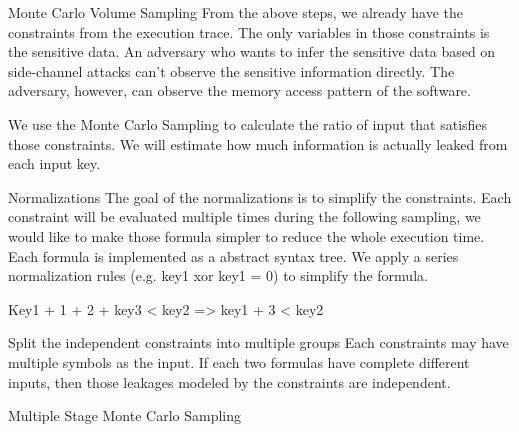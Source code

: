 Monte Carlo Volume Sampling
From the above steps, we already have the constraints from the execution trace. The only variables in those constraints is the sensitive data. An adversary who wants to infer the sensitive data based on side-channel attacks can’t observe the sensitive information directly. The adversary, however, can observe the memory access pattern of the software.  

We use the Monte Carlo Sampling to calculate the ratio of input that satisfies those constraints.
We will estimate how much information is actually leaked from each input key.

Normalizations
The goal of the normalizations is to simplify the constraints. Each constraint will be evaluated multiple times during the following sampling, we would like to make those formula simpler to reduce the whole execution time.  Each formula is implemented as a abstract syntax tree. We apply a series normalization rules (e.g. key1 xor key1 = 0) to simplify the formula.


Key1 + 1 + 2 + key3 < key2 => key1 + 3 < key2

Split the independent constraints into multiple groups
Each constraints may have multiple symbols as the input. If each two formulas have complete different inputs, then those leakages modeled by the constraints are independent. 

Multiple Stage Monte Carlo Sampling
